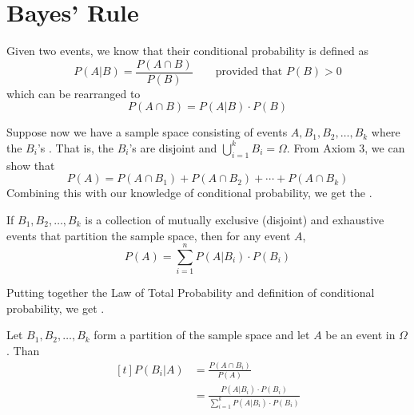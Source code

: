 \section{Bayes' Rule}

Given two events, we know that their conditional probability is defined as $$P(A | B) = \frac{P(A \cap B)}{P(B)} \qquad \text{provided that } P(B) > 0$$ which can be rearranged to $$P(A \cap B) = P(A | B) \cdot P(B)$$

Suppose now we have a sample space consisting  of events $A, B_1, B_2, \dots, B_k$ where the $B_i$'s . That is, the $B_i$'s are disjoint and $\bigcup_{i=1}^k B_i = \Omega$. From Axiom 3, we can show that $$P(A) = P(A \cap B_1) + P(A \cap B_2) + \cdots + P(A \cap B_k)$$ Combining this with our knowledge of conditional probability, we get the .

\begin{theorem}
    If $B_1, B_2, \dots, B_k$ is a collection of mutually exclusive (disjoint) and exhaustive events that partition the sample space, then for any event $A$, $$P(A) = \sum_{i=1}^n P(A | B_i) \cdot P(B_i)$$
\end{theorem}

Putting together the Law of Total Probability and definition of conditional probability, we get . 

\begin{theorem}
    Let $B_1, B_2, \dots, B_k$ form a partition of the sample space and let $A$ be an event in $\Omega$. Than $$\begin{aligned}[t]
        P(B_i | A) & = \frac{P(A \cap B_i)}{P(A)}                                           \\
                   & = \frac{P(A | B_i) \cdot P(B_i)}{\displaystyle \sum_{i=1}^k P(A | B_i) \cdot P(B_i)}
    \end{aligned}$$
\end{theorem}

